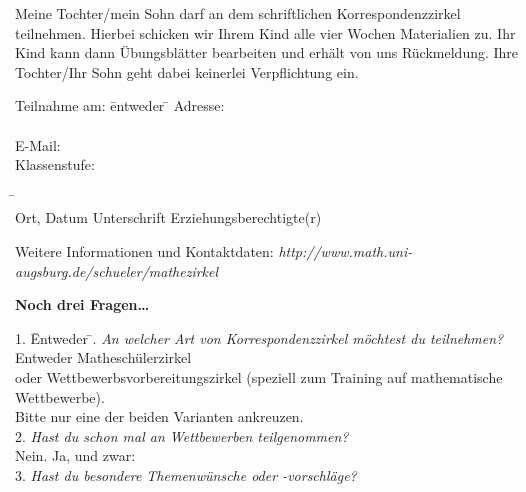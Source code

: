 \documentclass{mamazettel}
\begin{document}
\renewcommand{\betreff}{Anmeldung zum Matheschülerzirkel der Universität Augsburg}

\makeletterhead

Meine Tochter/mein Sohn \freist{9.5cm} darf an dem schriftlichen Korrespondenzzirkel
teilnehmen. Hierbei schicken wir Ihrem Kind alle vier Wochen Materialien zu.
Ihr Kind kann dann Übungsblätter bearbeiten und erhält von uns Rückmeldung. Ihre Tochter/Ihr Sohn geht dabei keinerlei Verpflichtung ein.

\doublespacing

\begin{tabbing}
  Teilnahme am: \= entweder \= \kill
  Adresse: \> \freistLang \\
  \> \freistLang \\
  E-Mail: \> \freistLang \\
  Klassenstufe: \> \freistKurz
\end{tabbing}

\begin{tabbing}
  \freistMittel \qquad\qquad \= \kill
  \freistMittel \> \freistLaenger \\
  Ort, Datum \> Unterschrift Erziehungsberechtigte(r)
\end{tabbing}

\vspace{-1.2em}
\scriptsize
Weitere Informationen und Kontaktdaten:
\textsl{http:/\!/www.math.uni-augsburg.de/schueler/mathezirkel}

\small
\onehalfspacing

\vfill
\textbf{Noch drei Fragen\ldots}
\vspace{-1.3em}
\begin{tabbing}
  1. \= Entweder \= . \> \emph{An welcher Art von Korrespondenzzirkel möchtest du teilnehmen?} \\
  \> Entweder \> \checkbox Matheschülerzirkel \\
  \> oder \> \checkbox
  Wettbewerbsvorbereitungszirkel (speziell zum Training auf mathematische \\
  \> \>  Wettbewerbe). \\
  \> Bitte nur eine der beiden Varianten ankreuzen. \\
  2. \> \emph{Hast du schon mal an Wettbewerben teilgenommen?} \\
  \> \checkbox Nein. \quad \checkbox Ja, und zwar: \freist{10.8cm} \\
  3. \> \emph{Hast du besondere Themenwünsche oder -vorschläge?} \\[0.5em]
  \> \freist{16cm}
\end{tabbing}
\end{document}
